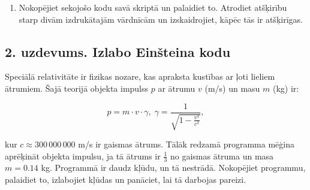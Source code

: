 \begin{Shaded}
\begin{Highlighting}[]
\OperatorTok{=} 
\end{Highlighting}
\end{Shaded}

\begin{enumerate}
\def\labelenumi{\alph{enumi})}
\setcounter{enumi}{1}
\tightlist
\item
  Nokopējiet sekojošo kodu savā skriptā un palaidiet to. Atrodiet
  atšķirību starp divām izdrukātajām vārdnīcām un izskaidrojiet, kāpēc
  tās ir atšķirīgas.
\end{enumerate}

\begin{Shaded}
\begin{Highlighting}[]
\OperatorTok{=}
\NormalTok{: }\NormalTok{\})}
\NormalTok{(}\StringTok{\textquotesingle{}}\StringTok{\textquotesingle{}}\NormalTok{)}
\OperatorTok{=}
\NormalTok{: }\NormalTok{\})}
\end{Highlighting}
\end{Shaded}

\subsection{2. uzdevums. Izlabo Einšteina
kodu}\label{uzdevums.-izlabo-einux161teina-kodu}

Speciālā relativitāte ir fizikas nozare, kas apraksta kustības ar ļoti
lieliem ātrumiem. Šajā teorijā objekta impulss \(p\) ar ātrumu \(v\)
(m/s) un masu \(m\) (kg) ir:

\[
p = m \cdot v \cdot \gamma, \; \gamma = \frac{1}{\sqrt{1 - \frac{v^2}{c^2}}},
\]

kur \(c \approx 300 \, 000 \, 000\) m/s ir gaismas ātrums. Tālāk redzamā
programma mēģina aprēķināt objekta impulsu, ja tā ātrums ir
\(\tfrac{1}{3}\) no gaismas ātruma un masa \(m = 0.14\) kg. Programmā ir
daudz kļūdu, un tā nestrādā. Nokopējiet programmu, palaidiet to,
izlabojiet kļūdas un panāciet, lai tā darbojas pareizi.

